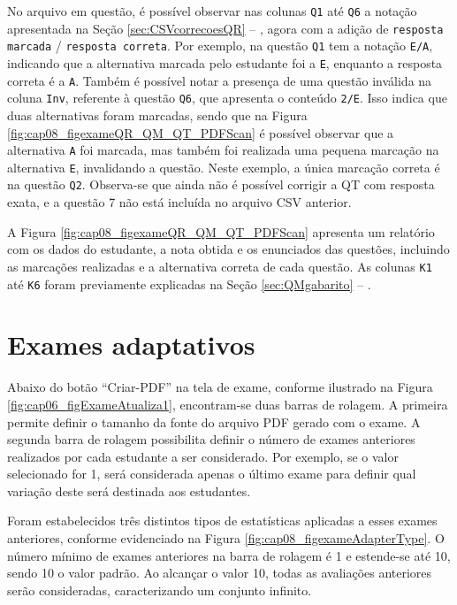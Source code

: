 


No arquivo em questão, é possível observar nas colunas \verb|Q1| até \verb|Q6| a notação apresentada na Seção \ref{sec:CSVcorrecoesQR} -- , agora com a adição de \verb|resposta marcada| / \verb|resposta correta|. Por exemplo, na questão \verb|Q1| tem a notação \verb|E/A|, indicando que a alternativa marcada pelo estudante foi a \verb|E|, enquanto a resposta correta é a \verb|A|. Também é possível notar a presença de uma questão inválida na coluna \verb|Inv|, referente à questão \verb|Q6|, que apresenta o conteúdo \verb|2/E|. Isso indica que duas alternativas foram marcadas, sendo que na Figura \ref{fig:cap08_figexameQR_QM_QT_PDFScan} é possível observar que a alternativa \verb|A| foi marcada, mas também foi realizada uma pequena marcação na alternativa \verb|E|, invalidando a questão. Neste exemplo, a única marcação correta é na questão \verb|Q2|. Observa-se que ainda não é possível corrigir a QT com resposta exata, e a questão 7 não está incluída no arquivo CSV anterior.

A Figura \ref{fig:cap08_figexameQR_QM_QT_PDFScan} apresenta um relatório com os dados do estudante, a nota obtida e os enunciados das questões, incluindo as marcações realizadas e a alternativa correta de cada questão. As colunas \verb|K1| até \verb|K6| foram previamente explicadas na Seção \ref{sec:QMgabarito} -- .

\section{Exames adaptativos}\label{sec:testeAdaptativo}

Abaixo do botão ``Criar-PDF'' na tela de exame, conforme ilustrado na Figura \ref{fig:cap06_figExameAtualiza1}, encontram-se duas barras de rolagem. A primeira permite definir o tamanho da fonte do arquivo PDF gerado com o exame. A segunda barra de rolagem possibilita definir o número de exames anteriores realizados por cada estudante a ser considerado. Por exemplo, se o valor selecionado for 1, será considerada apenas o último exame para definir qual variação deste será destinada aos estudantes. 

Foram estabelecidos três distintos tipos de estatísticas aplicadas a esses exames anteriores, conforme evidenciado na Figura \ref{fig:cap08_figexameAdapterType}. O número mínimo de exames anteriores na barra de rolagem é 1 e estende-se até 10, sendo 10 o valor padrão. Ao alcançar o valor 10, todas as avaliações anteriores serão consideradas, caracterizando um conjunto infinito.

